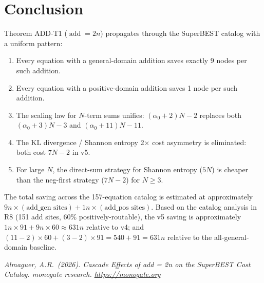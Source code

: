 \documentclass[12pt,a4paper]{article}
\theoremstyle{definition}
\newcommand{\addop}{\operatorname{add}}
\begin{document}
\section{Conclusion}
\label{sec:conclusion}

Theorem ADD-T1 ($\addop = 2n$) propagates through the SuperBEST catalog
with a uniform pattern:
\begin{enumerate}
  \item Every equation with a general-domain addition saves exactly 9 nodes
        per such addition.
  \item Every equation with a positive-domain addition saves 1 node per such
        addition.
  \item The scaling law for $N$-term sums unifies:
        $(\alpha_0 + 2)N - 2$ replaces both $(\alpha_0 + 3)N - 3$ and
        $(\alpha_0 + 11)N - 11$.
  \item The KL divergence / Shannon entropy 2$\times$ cost asymmetry is
        eliminated: both cost $7N - 2$ in v5.
  \item For large $N$, the direct-sum strategy for Shannon entropy ($5N$)
        is cheaper than the neg-first strategy ($7N - 2$) for $N \geq 3$.
\end{enumerate}

The total saving across the 157-equation catalog is estimated at approximately
$9n \times (\text{add\_gen sites}) + 1n \times (\text{add\_pos sites})$.
Based on the catalog analysis in R8 (151 add sites, 60\% positively-routable),
the v5 saving is approximately $1n \times 91 + 9n \times 60 \approx 631n$
relative to v4; and $(11-2) \times 60 + (3-2) \times 91 = 540 + 91 = 631n$
relative to the all-general-domain baseline.

\bigskip

\noindent\textit{Almaguer, A.R.\ (2026).
Cascade Effects of add = 2n on the SuperBEST Cost Catalog.
monogate research. \url{https://monogate.org}}
\end{document}
